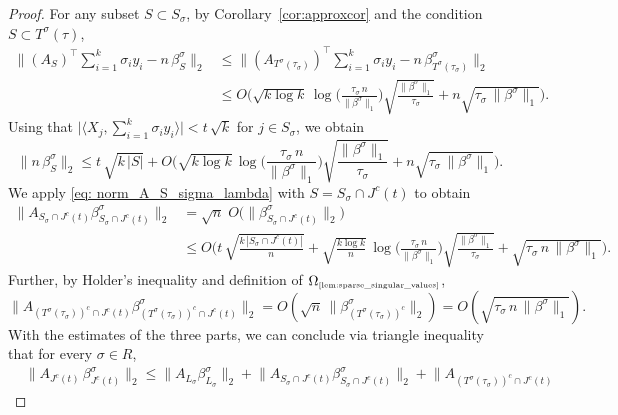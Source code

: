 \documentclass[11pt]{amsart}
\theoremstyle{definition}
\theoremstyle{plain}
\begin{document}
\begin{proof}
For any subset $S \subset S_\sigma$, 
by Corollary~\ref{cor:approxcor} and the condition
$S\subset T^\sigma(\tau)$,
\begin{align*}
\Big\| (A_{S})^\top \sum_{i=1}^k \sigma_i y_i 
- n\, \beta^\sigma_{S} \Big\|_2
&\le 
\Big\| (A_{T^\sigma(\tau_\sigma)})^\top \sum_{i=1}^k \sigma_i y_i 
- n\, \beta^\sigma_{T^\sigma(\tau_\sigma)} \Big\|_2\\
&\leq
  O
  \bigg(\sqrt{k\log k}\,\log\Big(\frac{\tau_\sigma\,n}{\|\beta^\sigma\|_1}\Big) \sqrt{\frac{\|\beta^\sigma\|_1}{\tau_\sigma}}
  +n \sqrt{\tau_\sigma\,\|\beta^\sigma\|_1}\bigg).
\end{align*}
Using that
$\big|\big\langle X_j,\sum_{i=1}^k \sigma_i y_i\big\rangle\big| <
t\,\sqrt{k}$ for $j \in S_\sigma$, we obtain
\begin{equation}\label{eq: norm_A_S_sigma_lambda}
     \|n\, \beta^\sigma_{S} \|_2 
\le 
     t\,\sqrt{k\,|S|} + 
     O
  \bigg(\sqrt{k\log k}\,\log\Big(\frac{\tau_\sigma\,n}{\|\beta^\sigma\|_1}\Big) \sqrt{\frac{\|\beta^\sigma\|_1}{\tau_\sigma}}
  +n \sqrt{\tau_\sigma\,\|\beta^\sigma\|_1}\bigg).
\end{equation}
We apply \eqref{eq: norm_A_S_sigma_lambda} with $S = S_\sigma \cap J^c(t)$ to obtain 
\begin{align*}
    \Big\|A_{S_\sigma \cap J^c(t)}
    \beta_{S_\sigma \cap J^c(t)}^\sigma\Big\|_2
&=
    \sqrt{n}\;
    O\big(\big\|\beta_{S_\sigma \cap J^c(t)}^\sigma\big\|_2\big)\\
&\leq 
O\bigg(t\,\sqrt{\frac{k\,|S_\sigma \cap J^c(t)|}{n}} +
\sqrt{\frac{k\log k}{n}}\,\log\Big(\frac{\tau_\sigma\,n}{\|\beta^\sigma\|_1}\Big) \sqrt{\frac{\|\beta^\sigma\|_1}{\tau_\sigma}}
  + \sqrt{\tau_\sigma\,n\,\|\beta^\sigma\|_1}\bigg).
\end{align*}
Further, 
by Holder's inequality and
definition of $\Omega_{\text{\tiny\ref{lem:sparse_singular_values}}}$,
$$
\Big\|A_{(T^\sigma(\tau_\sigma))^c \cap J^c(t)} \beta_{(T^\sigma(\tau_\sigma))^c \cap J^c(t)}^\sigma\Big\|_2
=O(\sqrt{n}\,\|\beta_{(T^\sigma(\tau_\sigma))^c}^\sigma\|_2)
=O(\sqrt{\tau_\sigma\,n\,\|\beta^\sigma\|_1}).
$$
With the estimates of the three parts, we can conclude via triangle inequality that for every $\sigma\in R$,
\begin{align*}
    &\Big\|A_{J^c(t)}\, \beta_{J^c(t)}^\sigma\Big\|_2
\leq
\big\|A_{L_\sigma} \beta_{L_\sigma}^\sigma\big\|_2
+
\big\|A_{S_\sigma \cap J^c(t)} \beta_{S_\sigma \cap J^c(t)}^\sigma\big\|_2
+
 \big\|A_{(T^\sigma(\tau_\sigma))^c \cap J^c(t)}

\end{align*}
\end{proof}
\end{document}
